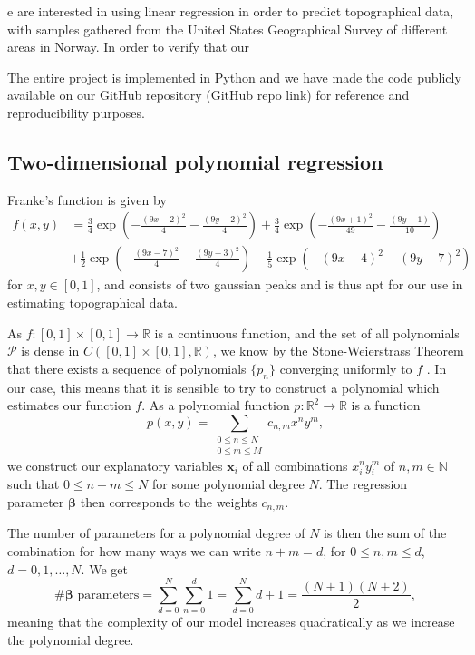 \documentclass{article}
\begin{document}
e are interested in using linear regression in order to predict topographical data, with samples gathered from the United States Geographical Survey of different areas in Norway. In order to verify that our

The entire project is implemented in Python and we have made the code publicly available on our GitHub repository (GitHub repo link) for reference and reproducibility purposes.

\subsection{Two-dimensional polynomial regression}
Franke's function is given by
\begin{equation*}
    \begin{split}
        f(x,y) & = \frac{3}{4}\exp\left(-\frac{(9x-2)^2}{4} - \frac{(9y-2)^2}{4}\right) + \frac{3}{4}\exp\left(-\frac{(9x+1)^2}{49} - \frac{(9y+1)}{10}\right) \\
        & + \frac{1}{2}\exp\left(-\frac{(9x-7)^2}{4} - \frac{(9y-3)^2}{4}\right) - \frac{1}{5}\exp\left(-(9x-4)^2 - (9y-7)^2\right)
    \end{split}
\end{equation*}
for $x, y \in [0, 1]$, and consists of two gaussian peaks and is thus apt for our use in estimating topographical data.

As $f: [0,1] \times [0, 1] \to \mathbb{R}$ is a continuous function, and the set of all polynomials $\mathcal{P}$ is dense in $C([0,1] \times [0,1], \mathbb{R})$, we know by the Stone-Weierstrass Theorem that there exists a sequence of polynomials $\{p_n\}$ converging uniformly to $f$ \cite[p.~116--129]{lindstrom2017spaces}. In our case, this means that it is sensible to try to construct a polynomial which estimates our function $f$. As a polynomial function $p: \mathbb{R}^2 \to \mathbb{R}$ is a function
\begin{equation*}
    p(x,y) = \sum_{\substack{0 \leq n \leq N \\ 0 \leq m \leq M}} c_{n,m} x^n y^m,
\end{equation*}
we construct our explanatory variables $\boldsymbol{x}_i$ of all combinations $x_i^n y_i^m$ of $n,m \in \mathbb{N}$ such that $0 \leq n + m \leq N$ for some polynomial degree $N$. The regression parameter $\boldsymbol{\beta}$ then corresponds to the weights $c_{n,m}$.

The number of parameters for a polynomial degree of $N$ is then the sum of the combination for how many ways we can write $n+m = d$, for $0\leq n,m \leq d$, $d = 0, 1, \ldots, N$. We get
\begin{equation*}
    \text{\# $\boldsymbol{\beta}$ parameters} = \sum_{d = 0}^N \sum_{n = 0}^d 1
    = \sum_{d = 0}^N d + 1
    = \frac{(N + 1)(N + 2)}{2},
\end{equation*}
meaning that the complexity of our model increases quadratically as we increase the polynomial degree.
\end{document}
